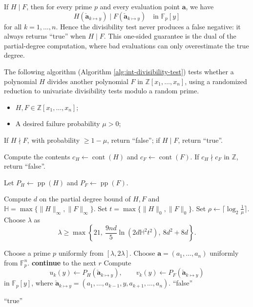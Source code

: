 \documentclass{article}
\numberwithin{equation}{section}
\begin{document}
\begin{remark}
If $H \mid F$, then for every prime $p$ and every evaluation point $\mathbf{a}$, we have
\[
H(\mathbf{\check{a}}_{k \mapsto y} ) \mid F(\mathbf{\check{a}}_{k \mapsto y} ) \quad \text{in } \mathbb{F}_p[y]
\]
for all $k=1,\dots,n$. Hence the divisibility test never produces a false negative: it always returns ``true'' when $H \mid F$. This one-sided guarantee is the dual of the partial-degree computation, where bad evaluations can only overestimate the true degree.
\end{remark}



The following algorithm (Algorithm \ref{alg:int-divisibility-test}) tests whether a polynomial $H$ divides another polynomial $F$ in $\mathbb{Z}[x_1,\dots,x_n]$, using a randomized reduction to univariate divisibility tests modulo a random prime.

\begin{algorithm}
\caption{Probabilistic Divisibility Test over the Integers}
\label{alg:int-divisibility-test}
\begin{algorithmic}[1]
\Require
    \begin{itemize}
        \item $H, F \in \mathbb{Z}[x_1,\dots,x_n]$;
        \item A desired failure probability $\mu > 0$;
    \end{itemize}
\Ensure
    If $H \nmid F$, with probability $\ge 1-\mu$, return ``false''; if $H \mid F$, return ``true''.

\State Compute the contents $c_H \gets \operatorname{cont}(H)$ and $c_F \gets \operatorname{cont}(F)$. If $c_H \nmid c_F$ in $\mathbb{Z}$, return ``false''.

\State Let $P_H \gets \operatorname{pp}(H)$ and $P_F \gets \operatorname{pp}(F)$.

\State Compute $d$ on the partial degree bound of $H,F$ and $\mathbb{H} = \max\{\|H\|_\infty, \|F\|_\infty\}$.
\State Set $t = \max\{\|H\|_0, \|F\|_0\}$.
\State Set $\rho \gets \lceil \log_2\frac{1}{\mu} \rceil$.
\State Choose $\lambda$ as
\[
\lambda \ge \max\left\{
    21,\ 
    \frac{9 n d}{5} \ln(2 d \mathbb{H}^2 t^2),\ 
    8 d^2 + 8 d
\right\}.
\]

    \State Choose a prime $p$ uniformly from $[\lambda, 2\lambda]$.
    \State Choose $\mathbf{a} = (a_1,\dots,a_n)$ uniformly from $\mathbb{F}_p^n$.
    \For{$k = 1$ to $n$}
            \State \textbf{continue} to the next $r$
        \EndIf
        \State Compute
        \[
        u_k(y) \gets P_H(\mathbf{\check{a}}_{k \mapsto y} ), \qquad v_k(y) \gets P_F(\mathbf{\check{a}}_{k \mapsto y} )
        \]
        in $\mathbb{F}_p[y]$, where $\mathbf{\check{a}}_{k \mapsto y}  = (a_1,\dots,a_{k-1}, y, a_{k+1},\dots,a_n)$.
            \State \Return ``false''
        \EndIf
    \EndFor
\EndFor

\State \Return ``true''
\end{algorithmic}
\end{algorithm}
\end{document}
